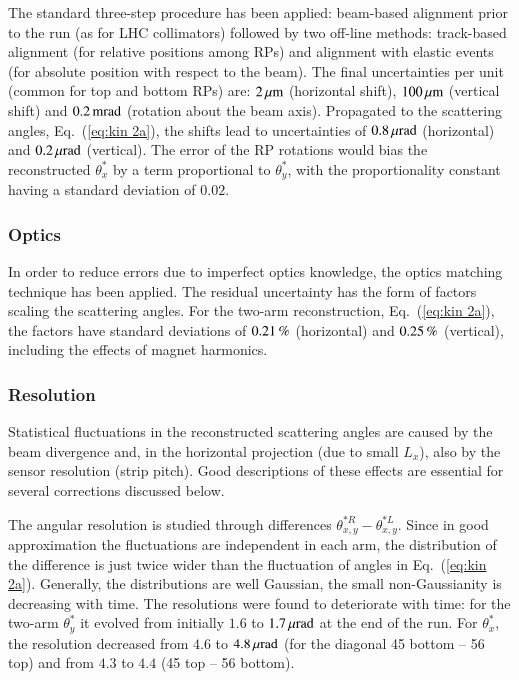 The standard three-step procedure \cite{totem-ijmp} has been applied: beam-based alignment prior to the run (as for LHC collimators) followed by two off-line methods: track-based alignment (for relative positions among RPs) and alignment with elastic events (for absolute position with respect to the beam). The final uncertainties per unit (common for top and bottom RPs) are: $2\,{\rm \mu m}$ (horizontal shift), $100\,{\rm \mu m}$ (vertical shift) and $0.2\,{\rm mrad}$ (rotation about the beam axis). Propagated to the scattering angles, Eq.~(\ref{eq:kin 2a}), the shifts lead to uncertainties of $0.8\,{\rm \mu rad}$ (horizontal) and $0.2\,{\rm \mu rad}$ (vertical). The error of the RP rotations would bias the reconstructed $\theta_x^*$ by a term proportional to $\theta_y^*$, with the proportionality constant having a standard deviation of $0.02$.



\subsubsection{Optics}
\label{sec:optics}

In order to reduce errors due to imperfect optics knowledge, the optics matching technique \cite{totem-optics} has been applied. The residual uncertainty has the form of factors scaling the scattering angles. %
For the two-arm reconstruction, Eq.~(\ref{eq:kin 2a}), the factors have standard deviations of $0.21\,{\rm \%}$ (horizontal) and $0.25\,{\rm \%}$ (vertical), including the effects of magnet harmonics.



\subsubsection{Resolution}
\label{sec:resolution}

Statistical fluctuations in the reconstructed scattering angles are caused by 
the beam divergence and, in the horizontal projection (due to small $L_x$), 
also by the sensor resolution (strip pitch). Good descriptions of these effects
are essential for several corrections discussed below.

The angular resolution is studied through differences $\theta_{x,y}^{*R} - \theta_{x,y}^{*L}$. Since in good approximation the fluctuations are independent in each arm, the distribution of the difference is just twice wider than the fluctuation of angles in Eq.~(\ref{eq:kin 2a}). Generally, the distributions are well Gaussian, the small non-Gaussianity is decreasing with time. The resolutions were found to deteriorate with time: for the two-arm $\theta_y^*$ it evolved from initially $1.6$ to $1.7\,{\rm \mu rad}$ at the end of the run. For $\theta_x^*$, the resolution decreased from $4.6$ to $4.8\,{\rm \mu rad}$ (for the diagonal 45 bottom -- 56 top) and from $4.3$ to $4.4$ (45 top -- 56 bottom).

